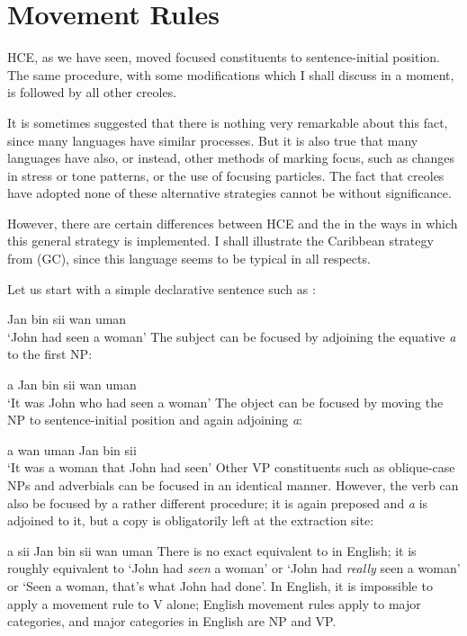 \section{Movement Rules}

HCE, as we have seen, moved focused constituents to sentence-initial position. The same procedure, with some modifications which I shall discuss in a moment, is followed by all other creoles.

It is sometimes suggested that there is nothing very remarkable about this fact, since many languages have similar processes. But it is also true that many languages have also, or instead, other methods of marking focus, such as changes in stress or tone patterns, or the use of focusing particles. The fact that creoles have adopted none of these alternative strategies cannot be without significance.


However, there are certain differences between HCE and the  in the ways in which this general strategy is imple\-mented. I shall illustrate the Caribbean strategy from  (GC), since this language seems to be typical in all respects.

Let us start with a simple declarative sentence such as :

\ea\label{ex:2:1}
 Jan bin sii wan uman \\
\glt `John had seen a woman'
\z %
The subject can be focused by adjoining the equative  \textit{a} to the first NP:

\ea\label{ex:2:2}
 a Jan bin sii wan uman\\
\glt `It was John who had seen a woman'
\z
The object can be focused by moving the NP to sentence-initial position and again adjoining \textit{a}:

\ea\label{ex:2:3}
 a wan uman Jan bin sii \\
\glt `It was a woman that John had seen'
\z
Other VP constituents such as oblique-case NPs and adverbials can be focused in an identical manner. However, the verb can also be focused by a rather different procedure; it is again preposed and \textit{a} is adjoined to it, but a copy is obligatorily left at the extraction site:

\ea\label{ex:2:4}
 a sii Jan bin sii wan uman
\z
There is no exact equivalent to  in English; it is roughly equivalent to `John had \textit{seen} a woman' or `John had \textit{really} seen a woman' or `Seen a woman, that's what John had done'. In English, it is impossible to apply a movement rule to V alone; English movement rules apply to major categories, and major categories in English are NP and VP.

